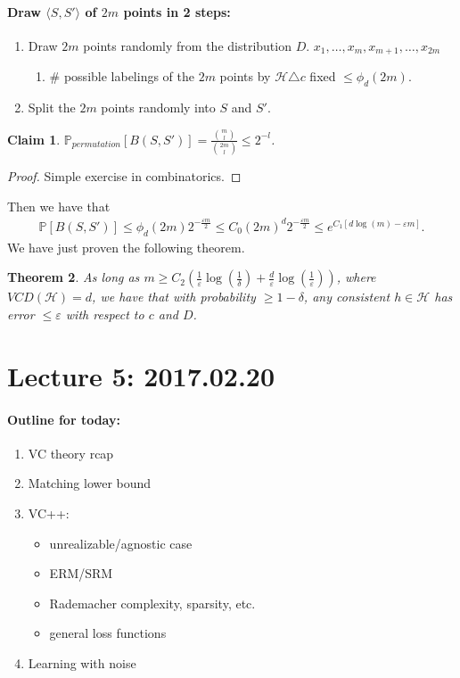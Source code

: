 \documentclass[12pt, letterpaper]{article}
\numberwithin{equation}{section} %
\newcommand{\mb}{\mathbb}
\newcommand{\mc}{\mathcal}
\newcommand{\ve}{\varepsilon}
\newtheorem{theorem}{Theorem}[section]
\newtheorem{claim}[theorem]{Claim}
\theoremstyle{definition}
\theoremstyle{remark}
\begin{document}
\paragraph{Draw $\langle S, S'\rangle$ of $2m$ points in 2 steps:}
\begin{enumerate}
\item Draw $2m$ points randomly from the distribution $D$. $x_1,\ldots, x_m, x_{m+1},\ldots, x_{2m}$
\begin{enumerate}[-]
\item \# possible labelings of the $2m$ points by $\mc H \triangle c$ fixed $\leq \phi_d(2m)$.
\end{enumerate}
\item Split the $2m$ points randomly into $S$ and $S'$.
\end{enumerate}

\begin{claim}
$\mb P_{permutation}[B\left(S, S'\right)] = \frac{\binom{m}{l}}{\binom{2m}{l}}\leq 2^{-l}$.
\end{claim}
\begin{proof}
    Simple exercise in combinatorics.
\end{proof}
Then we have that
\begin{align}
    \mb P[B\left(S, S'\right)] \leq \phi_d(2m)2^{-\frac{\ve m}2} \leq C_0 (2m)^d 2^{-\frac{\ve m}2} \leq e^{C_1[d\log(m)-\ve m]}.
\end{align}
We have just proven the following theorem.
\begin{theorem}
    As long as $m\geq C_2\left(\frac1\ve\log\left(\frac1\delta
    \right) + \frac{d}\ve\log\left(\frac1\ve\right)\right)$, where $VCD(\mc H) = d$, we have that with probability $\geq 1-\delta$, any \emph{consistent} $h\in\mc H$ has error $\leq \ve$ with respect to $c$ and $D$.
\end{theorem}


\section{Lecture 5: 2017.02.20}

\paragraph{Outline for today:}
\begin{enumerate}
\item VC theory rcap
\item Matching lower bound
\item VC++:
    \begin{itemize}
    \item unrealizable/agnostic case
    \item ERM/SRM
    \item Rademacher complexity, sparsity, etc.
    \item general loss functions
    \end{itemize}
\item Learning with noise
\end{enumerate}
\end{document}

